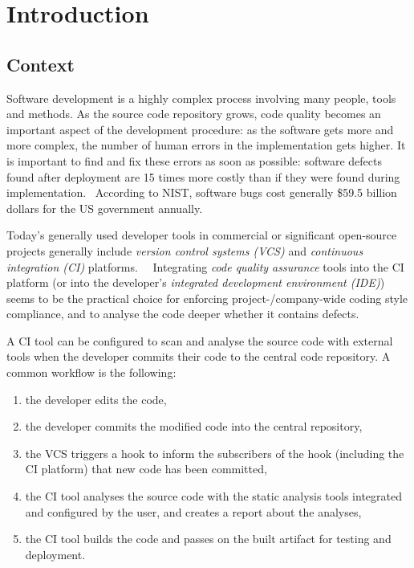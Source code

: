 \chapter{Introduction}

\section{Context}

Software development is a highly complex process involving many people, tools and methods. As the source code repository grows, code quality becomes an important aspect of the development procedure: as the software gets more and more complex, the number of human errors in the implementation gets higher. It is important to find and fix these errors as soon as possible: software defects found after deployment are 15 times more costly than if they were found during implementation.~\cite{dawson2010integrating} According to NIST, software bugs cost generally \$59.5 billion dollars for the US government annually.~\cite{tassey2002economic}

Today's generally used developer tools in commercial or significant open-source projects generally include \emph{version control systems (VCS)} and \emph{continuous integration (CI)} platforms.~\cite{hilton2016usage}~\cite{fowlerCI} Integrating \emph{code quality assurance} tools into the CI platform (or into the developer's \emph{integrated development environment (IDE)}) seems to be the practical choice for enforcing project-/company-wide coding style compliance, and to analyse the code deeper whether it contains defects.

A CI tool can be configured to scan and analyse the source code with external tools when the developer commits their code to the central code repository. A common workflow is the following:

\begin{enumerate}
\item the developer edits the code,
\item the developer commits the modified code into the central repository,
\item the VCS triggers a hook to inform the subscribers of the hook (including the CI platform) that new code has been committed,
\item the CI tool analyses the source code with the static analysis tools integrated and configured by the user, and creates a report about the analyses,
\item the CI tool builds the code and passes on the built artifact for testing and deployment.
\end{enumerate}

